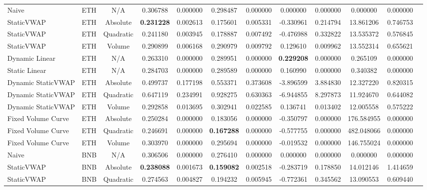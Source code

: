 \begin{table}[H]
{\begin{tabular}{llcccccccccc}
        \hline
        Naive & ETH & N/A & 0.306788 & 0.000000 & 0.298487 & 0.000000 & 0.000000 & 0.000000 & 0.000000 & 0.000000 \\
        StaticVWAP & ETH & Absolute & \textbf{0.231228} & 0.002613 & 0.175601 & 0.005331 & -0.330961 & 0.214794 & 13.861206 & 0.746753 \\
        StaticVWAP & ETH & Quadratic & 0.241180 & 0.003945 & 0.178887 & 0.007492 & -0.476988 & 0.332822 & 13.535372 & 0.576845 \\
        StaticVWAP & ETH & Volume & 0.290899 & 0.006168 & 0.290979 & 0.009792 & 0.129610 & 0.009962 & 13.552314 & 0.655621 \\
        Dynamic Linear & ETH & N/A & 0.263310 & 0.000000 & 0.289951 & 0.000000 & \textbf{0.229208} & 0.000000 & 0.265109 & 0.000000 \\
        Static Linear & ETH & N/A & 0.284703 & 0.000000 & 0.289589 & 0.000000 & 0.160990 & 0.000000 & 0.340382 & 0.000000 \\
        Dynamic StaticVWAP & ETH & Absolute & 0.499737 & 0.177198 & 0.553371 & 0.373608 & -3.896599 & 3.884830 & 12.327220 & 0.820315 \\
        Dynamic StaticVWAP & ETH & Quadratic & 0.647119 & 0.234991 & 0.928275 & 0.630363 & -6.944855 & 8.297873 & 11.924670 & 0.644082 \\
        Dynamic StaticVWAP & ETH & Volume & 0.292858 & 0.013695 & 0.302941 & 0.022585 & 0.136741 & 0.013402 & 12.005558 & 0.575222 \\
        Fixed Volume Curve & ETH & Absolute & 0.250284 & 0.000000 & 0.183056 & 0.000000 & -0.350797 & 0.000000 & 176.584955 & 0.000000 \\
        Fixed Volume Curve & ETH & Quadratic & 0.246691 & 0.000000 & \textbf{0.167288} & 0.000000 & -0.577755 & 0.000000 & 482.048066 & 0.000000 \\
        Fixed Volume Curve & ETH & Volume & 0.303970 & 0.000000 & 0.295694 & 0.000000 & -0.019532 & 0.000000 & 146.755024 & 0.000000 \\
        \hline
        Naive & BNB & N/A & 0.306506 & 0.000000 & 0.276410 & 0.000000 & 0.000000 & 0.000000 & 0.000000 & 0.000000 \\
        StaticVWAP & BNB & Absolute & \textbf{0.238088} & 0.001673 & \textbf{0.159082} & 0.002518 & -0.283719 & 0.178850 & 14.012146 & 1.414659 \\
        StaticVWAP & BNB & Quadratic & 0.274563 & 0.004827 & 0.194232 & 0.005945 & -0.772361 & 0.345562 & 13.090553 & 0.609440 \\

\end{tabular}}
\end{table}
